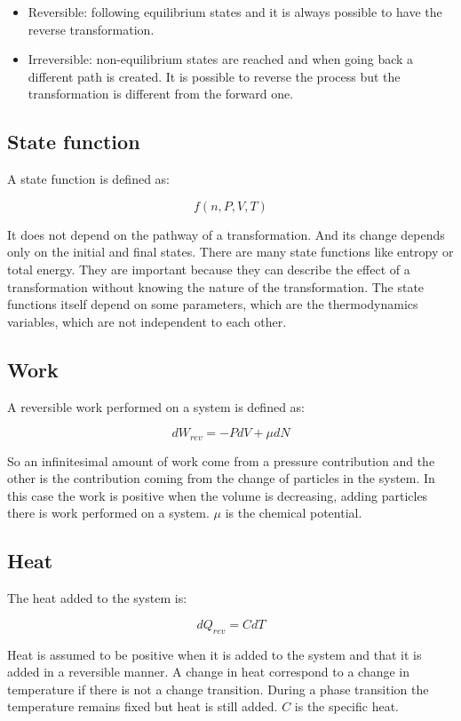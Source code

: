 	\begin{multicols}{2}
		\begin{itemize}
			\item Reversible: following equilibrium states and it is always possible to have the reverse transformation.
			\item Irreversible: non-equilibrium states are reached and when going back a different path is created.
				It is possible to reverse the process but the transformation is different from the forward one.
		\end{itemize}
	\end{multicols}

	\subsection{State function}
	A state function is defined as:

	$$f(n, P, V, T)$$

	It does not depend on the pathway of a transformation.
	And its change depends only on the initial and final states.
	There are many state functions like entropy or total energy.
	They are important because they can describe the effect of a transformation without knowing the nature of the transformation.
	The state functions itself depend on some parameters, which are the thermodynamics variables, which are not independent to each other.

	\subsection{Work}
	A reversible work performed on a system is defined as:

	$$dW_{rev} = -PdV + \mu dN$$

	So an infinitesimal amount of work come from a pressure contribution and the other is the contribution coming from the change of particles in the system.
	In this case the work is positive when the volume is decreasing, adding particles there is work performed on a system.
	$\mu$ is the chemical potential.

	\subsection{Heat}
	The heat added to the system is:

	$$dQ_{rev} = CdT$$

	Heat is assumed to be positive when it is added to the system and that it is added in a reversible manner.
	A change in heat correspond to a change in temperature if there is not a change transition.
	During a phase transition the temperature remains fixed but heat is still added.
	$C$ is the specific heat.

